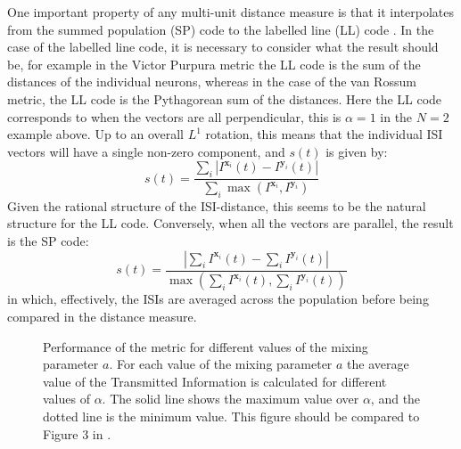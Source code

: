 \documentclass[12pt]{amsart}
\begin{document}
One important property of any multi-unit distance measure is that it interpolates from the summed population (SP) code  to the labelled line (LL) code .  In the case of the labelled line code, it is necessary to consider what the result should be, for example in the Victor Purpura metric the LL code is the sum of the distances of the individual neurons, whereas in the case of the van Rossum metric, the LL code is the Pythagorean sum of the distances.  Here the LL code corresponds to when the vectors are all perpendicular,   this is $\alpha=1$ in the $N=2$ example above.  Up to an overall $L^1$ rotation, this means that the individual ISI vectors will have a single non-zero component, and $s(t)$ is given by:
\begin{equation}
s(t) = \frac{\sum_i | I^{\mathbf{x}_i} (t)  - I^{\mathbf{y}_i}(t)|}{\sum_i \max (I^{\mathbf{x}_i},I^{\mathbf{y}_i})}
 \end{equation}
 Given the rational structure of the ISI-distance, this seems to be the natural structure for the LL code.  
Conversely, when all the vectors are parallel, the result is the SP code:
\begin{equation}
s(t) = \frac{| \sum_i I^{\mathbf{x}_i}(t) - \sum_i I^{\mathbf{y}_i}(t) |}{\max (\sum_i I^{\mathbf{x}_i}(t),\sum_i I^{\mathbf{y}_i}(t) )}
\end{equation}
in which, effectively, the ISIs are averaged across the population before being compared in the distance measure.

\begin{figure}[bht]
\begin{center}

\end{center}
\caption{Performance of the metric for different values of the mixing parameter $a$.  For each value of the mixing parameter $a$ the average value of the Transmitted Information is calculated for different values of $\alpha$.  The solid line shows the maximum value over $\alpha$, and the dotted line is the minimum value.  This figure should be compared to Figure 3 in \cite{HoughtonSen2008}.\label{fig:minmax}}
\end{figure}
\end{document}

